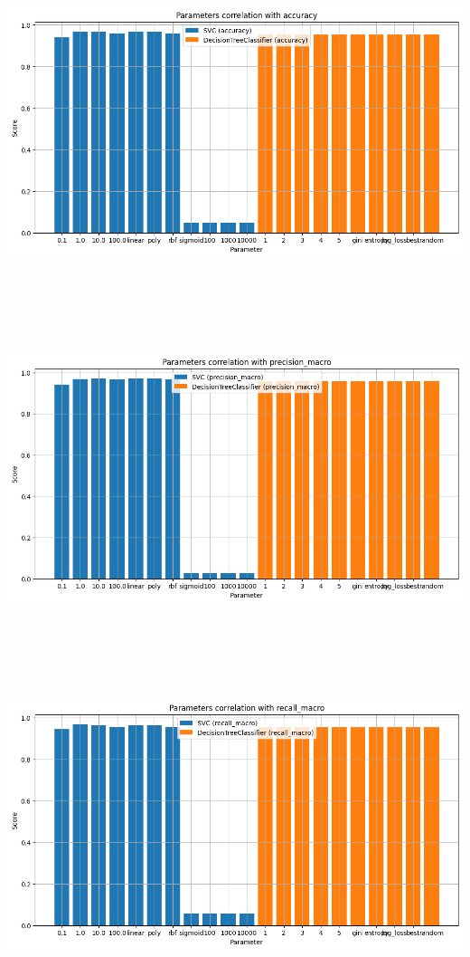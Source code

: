 \documentclass{article}
\begin{document}
\includegraphics[width=18cm, height=10cm]{output1.png}
\includegraphics[width=18cm, height=10cm]{output2.png}
\includegraphics[width=18cm, height=10cm]{output3.png}
\end{document}
